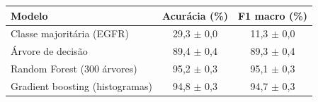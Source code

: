 \begin{tabular}{lcc}
\toprule
Modelo & Acurácia (\%) & F1 macro (\%) \\
\midrule
Classe majoritária (EGFR) & 29,3 $\pm$ 0,0 & 11,3 $\pm$ 0,0 \\
Árvore de decisão & 89,4 $\pm$ 0,4 & 89,3 $\pm$ 0,4 \\
Random Forest (300 árvores) & 95,2 $\pm$ 0,3 & 95,1 $\pm$ 0,3 \\
Gradient boosting (histogramas) & 94,8 $\pm$ 0,3 & 94,7 $\pm$ 0,3 \\
\bottomrule
\end{tabular}
